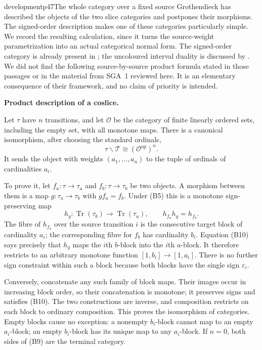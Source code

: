 \begin{dcomment}{development}{p47}{The whole category over a fixed source}
Grothendieck has described the objects of the two slice categories and postpones their morphisms. The signed-order description makes one of these categories particularly simple. We record the resulting calculation, since it turns the source-weight parametrization into an actual categorical normal form. The signed-order category is already present in \citet[\S4.1]{DwyerKan1980Calculating}; the uncoloured interval duality is discussed by \citet[\S2.7]{MakkaiZawadowski2001}. We did not find the following source-by-source product formula stated in those passages or in the material from SGA~1 reviewed here. It is an elementary consequence of their framework, and no claim of priority is intended.

\textbf{Product description of a coslice.}\ours\par
Let $\tau$ have $n$ transitions, and let $\mathcal O$ be the category of finite linearly ordered sets, including the empty set, with all monotone maps. There is a canonical isomorphism, after choosing the standard ordinals,
\[
                \tau\backslash\mathcal T
                 \cong(\mathcal O^{\mathrm{op}})^n.             \tag{B9}
\]
It sends the object with weights $(a_1,\ldots,a_n)$ to the tuple of ordinals of cardinalities $a_i$.

To prove it, let $f_a:\tau\to\tau_a$ and $f_b:\tau\to\tau_b$ be two objects. A morphism between them is a map $g:\tau_a\to\tau_b$ with $gf_a=f_b$. Under (B5) this is a monotone sign-preserving map
\[
 h_g:\operatorname{Tr}(\tau_b)\longrightarrow
             \operatorname{Tr}(\tau_a),\qquad
 h_{f_a}h_g=h_{f_b}.                              \tag{B10}
\]
The fibre of $h_{f_a}$ over the source transition $i$ is the consecutive target block of cardinality $a_i$; the corresponding fibre for $f_b$ has cardinality $b_i$. Equation (B10) says precisely that $h_g$ maps the $i$th $b$-block into the $i$th $a$-block. It therefore restricts to an arbitrary monotone function $[1,b_i]\to[1,a_i]$. There is no further sign constraint within such a block because both blocks have the single sign $\varepsilon_i$.

Conversely, concatenate any such family of block maps. Their images occur in increasing block order, so their concatenation is monotone; it preserves signs and satisfies (B10). The two constructions are inverse, and composition restricts on each block to ordinary composition. This proves the isomorphism of categories. Empty blocks cause no exception: a nonempty $b_i$-block cannot map to an empty $a_i$-block; an empty $b_i$-block has its unique map to any $a_i$-block. If $n=0$, both sides of (B9) are the terminal category.


\end{dcomment}
